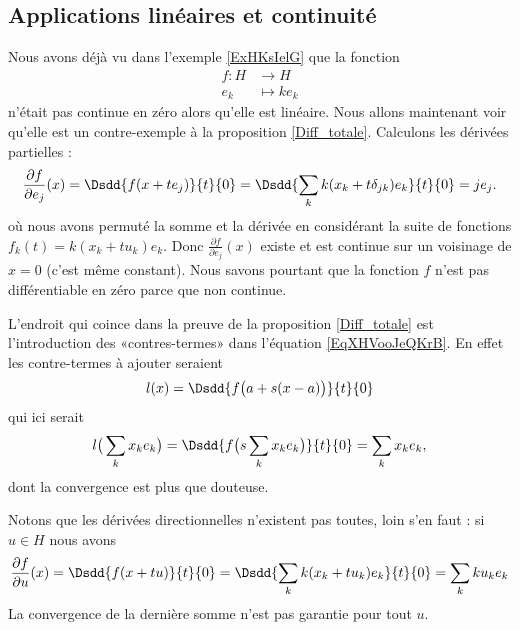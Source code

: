 \subsection{Applications linéaires et continuité}

Nous avons déjà vu dans l'exemple \ref{ExHKsIelG} que la fonction 
\begin{equation}    \label{EqCJVooJOuXdN}
    \begin{aligned}
        f\colon H&\to H \\
        e_k&\mapsto ke_k 
    \end{aligned}
\end{equation}
n'était pas continue en zéro alors qu'elle est linéaire. Nous allons maintenant voir qu'elle est un contre-exemple à la proposition \ref{Diff_totale}. Calculons les dérivées partielles :
\begin{equation}
    \frac{ \partial f }{ \partial e_j }(x)=\Dsdd{ f(x+te_j) }{t}{0}=\Dsdd{ \sum_k k(x_k+t\delta_{jk})e_k }{t}{0}=je_j.
\end{equation}
où nous avons permuté la somme et la dérivée en considérant la suite de fonctions \( f_k(t)=k(x_k+tu_k)e_k\). Donc \( \frac{ \partial f }{ \partial e_j }(x)\) existe et est continue sur un voisinage de \( x=0\) (c'est même constant). Nous savons pourtant que la fonction \( f\) n'est pas différentiable en zéro parce que non continue.

L'endroit qui coince dans la preuve de la proposition \ref{Diff_totale} est l'introduction des «contres-termes» dans l'équation \eqref{EqXHVooJeQKrB}. En effet les contre-termes à ajouter seraient
\begin{equation}
    l(x)=\Dsdd{ f\big( a+s(x-a) \big) }{t}{0}
\end{equation}
qui ici serait
\begin{equation}
    l\big( \sum_kx_ke_k \big)=\Dsdd{ f\big( s\sum_kx_ke_k \big) }{t}{0}=\sum_kx_ke_k,
\end{equation}
dont la convergence est plus que douteuse.

Notons que les dérivées directionnelles n'existent pas toutes, loin s'en faut : si \( u\in H\) nous avons
\begin{equation}
    \frac{ \partial f }{ \partial u }(x)=\Dsdd{ f(x+tu) }{t}{0}=\Dsdd{ \sum_k k(x_k+tu_k)e_k }{t}{0}=\sum_k ku_ke_k
\end{equation}
La convergence de la dernière somme n'est pas garantie pour tout \( u\).

